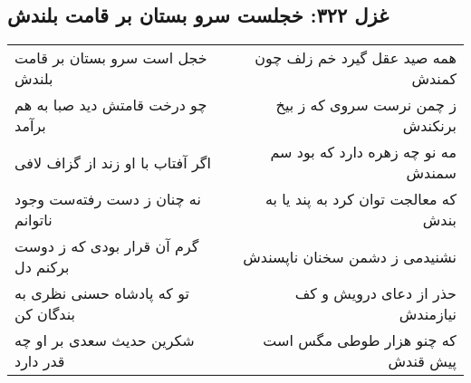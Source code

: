 \begin{center}
\section*{غزل ۳۲۲: خجلست سرو بستان بر قامت بلندش}
\label{sec:322}
\begin{longtable}{l p{0.5cm} r}
خجل است سرو بستان بر قامت بلندش
&&
همه صید عقل گیرد خم زلف چون کمندش
\\
چو درخت قامتش دید صبا به هم برآمد
&&
ز چمن نرست سروی که ز بیخ برنکندش
\\
اگر آفتاب با او زند از گزاف لافی
&&
مه نو چه زهره دارد که بود سم سمندش
\\
نه چنان ز دست رفته‌ست وجود ناتوانم
&&
که معالجت توان کرد به پند یا به بندش
\\
گرم آن قرار بودی که ز دوست برکنم دل
&&
نشنیدمی ز دشمن سخنان ناپسندش
\\
تو که پادشاه حسنی نظری به بندگان کن
&&
حذر از دعای درویش و کف نیازمندش
\\
شکرین حدیث سعدی بر او چه قدر دارد
&&
که چنو هزار طوطی مگس است پیش قندش
\\
\end{longtable}
\end{center}
